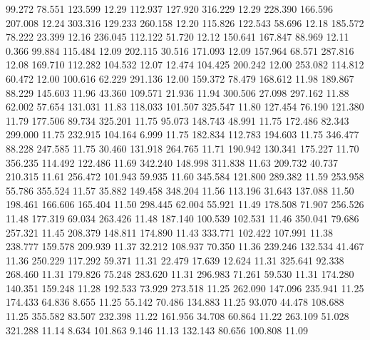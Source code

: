   99.272   78.551  123.599        12.29
 112.937  127.920  316.229        12.29
 228.390  166.596  207.008        12.24
 303.316  129.233  260.158        12.20
 115.826  122.543   58.696        12.18
 185.572   78.222   23.399        12.16
 236.045  112.122   51.720        12.12
 150.641  167.847   88.969        12.11
   0.366   99.884  115.484        12.09
 202.115   30.516  171.093        12.09
 157.964   68.571  287.816        12.08
 169.710  112.282  104.532        12.07
  12.474  104.425  200.242        12.00
 253.082  114.812   60.472        12.00
 100.616   62.229  291.136        12.00
 159.372   78.479  168.612        11.98
 189.867   88.229  145.603        11.96
  43.360  109.571   21.936        11.94
 300.506   27.098  297.162        11.88
  62.002   57.654  131.031        11.83
 118.033  101.507  325.547        11.80
 127.454   76.190  121.380        11.79
 177.506   89.734  325.201        11.75
  95.073  148.743   48.991        11.75
 172.486   82.343  299.000        11.75
 232.915  104.164    6.999        11.75
 182.834  112.783  194.603        11.75
 346.477   88.228  247.585        11.75
  30.460  131.918  264.765        11.71
 190.942  130.341  175.227        11.70
 356.235  114.492  122.486        11.69
 342.240  148.998  311.838        11.63
 209.732   40.737  210.315        11.61
 256.472  101.943   59.935        11.60
 345.584  121.800  289.382        11.59
 253.958   55.786  355.524        11.57
  35.882  149.458  348.204        11.56
 113.196   31.643  137.088        11.50
 198.461  166.606  165.404        11.50
 298.445   62.004   55.921        11.49
 178.508   71.907  256.526        11.48
 177.319   69.034  263.426        11.48
 187.140  100.539  102.531        11.46
 350.041   79.686  257.321        11.45
 208.379  148.811  174.890        11.43
 333.771  102.422  107.991        11.38
 238.777  159.578  209.939        11.37
  32.212  108.937   70.350        11.36
 239.246  132.534   41.467        11.36
 250.229  117.292   59.371        11.31
  22.479   17.639   12.624        11.31
 325.641   92.338  268.460        11.31
 179.826   75.248  283.620        11.31
 296.983   71.261   59.530        11.31
 174.280  140.351  159.248        11.28
 192.533   73.929  273.518        11.25
 262.090  147.096  235.941        11.25
 174.433   64.836    8.655        11.25
  55.142   70.486  134.883        11.25
  93.070   44.478  108.688        11.25
 355.582   83.507  232.398        11.22
 161.956   34.708   60.864        11.22
 263.109   51.028  321.288        11.14
   8.634  101.863    9.146        11.13
 132.143   80.656  100.808        11.09
